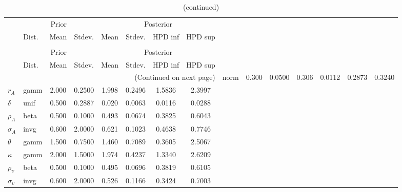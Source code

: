  
\begin{center}
\begin{longtable}{llcccccc} 
\caption{Results from Metropolis-Hastings (parameters)}
 \label{Table:MHPosterior:1}\\
\toprule 
  & \multicolumn{3}{c}{Prior}  &  \multicolumn{4}{c}{Posterior} \\
  \cmidrule(r{.75em}){2-4} \cmidrule(r{.75em}){5-8}
  & Dist. & Mean  & Stdev. & Mean & Stdev. & HPD inf & HPD sup\\
\midrule \endfirsthead 
\caption{(continued)}\\\toprule 
  & \multicolumn{3}{c}{Prior}  &  \multicolumn{4}{c}{Posterior} \\
  \cmidrule(r{.75em}){2-4} \cmidrule(r{.75em}){5-8}
  & Dist. & Mean  & Stdev. & Mean & Stdev. & HPD inf & HPD sup\\
\midrule \endhead 
\bottomrule \multicolumn{8}{r}{(Continued on next page)} \endfoot 
\bottomrule \endlastfoot 
${\alpha}$ & norm &   0.300 & 0.0500 &   0.306& 0.0112 &  0.2873 &  0.3240 \\ 
${r_{A}}$ & gamm &   2.000 & 0.2500 &   1.998& 0.2496 &  1.5836 &  2.3997 \\ 
${\delta}$ & unif &   0.500 & 0.2887 &   0.020& 0.0063 &  0.0116 &  0.0288 \\ 
${\rho_A}$ & beta &   0.500 & 0.1000 &   0.493& 0.0674 &  0.3825 &  0.6043 \\ 
${\sigma_A}$ & invg &   0.600 & 2.0000 &   0.621& 0.1023 &  0.4638 &  0.7746 \\ 
${\theta}$ & gamm &   1.500 & 0.7500 &   1.460& 0.7089 &  0.3605 &  2.5067 \\ 
${\kappa}$ & gamm &   2.000 & 1.5000 &   1.974& 0.4237 &  1.3340 &  2.6209 \\ 
${\rho_\upsilon}$ & beta &   0.500 & 0.1000 &   0.495& 0.0696 &  0.3819 &  0.6105 \\ 
${\sigma_\upsilon}$ & invg &   0.600 & 2.0000 &   0.526& 0.1166 &  0.3424 &  0.7003 \\ 
\end{longtable}
 \end{center}
